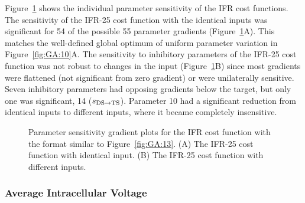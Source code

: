Figure~\ref{fig:GA:14} shows the individual parameter sensitivity of the
IFR cost functions.  The sensitivity of the IFR-25 cost function with
the identical inputs was significant for 54 of the possible 55
parameter gradients (Figure~\ref{fig:GA:14}A).  This matches the
well-defined global optimum of uniform parameter variation in
Figure~\ref{fig:GA:10}A.  The sensitivity to inhibitory parameters of the
IFR-25 cost function was not robust to changes in the {\ANF} input
(Figure~\ref{fig:GA:14}B) since most gradients were flattened (not
significant from zero gradient) or were unilaterally sensitive.  Seven
inhibitory parameters had opposing gradients below the target, but
only one was significant, 14 ($s_{{\rm DS}\to {\rm TS}} $). Parameter
10 had a significant reduction from identical inputs to different
inputs, where it became completely insensitive. %



\begin{figure}[th]
  \centering
 \caption{Parameter sensitivity gradient plots for the IFR cost function
    with the format similar to Figure~\ref{fig:GA:13}. (A) The IFR-25 cost
    function with identical input. (B) The IFR-25 cost function with
    different {\ANF} inputs. %
}
  \label{fig:GA:14}
\end{figure}


\subsubsection{Average Intracellular Voltage}

